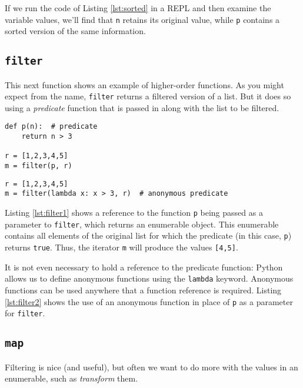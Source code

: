 \documentclass[ignorenonframetext,red]{beamer}
\begin{document}
\noindent If we run the code of Listing \ref{lst:sorted} in a REPL and then examine the variable values, we'll find that \texttt{n} retains its original value, while \texttt{p} contains a sorted version of the same information.

\subsection{\tt filter}
This next function shows an example of higher-order functions. As you might expect from the name, \texttt{filter} returns a filtered version of a list. But it does so using a \textit{predicate} function that is passed in along with the list to be filtered.

\begin{frame}[fragile]
\begin{lstlisting}[style=python,caption={Filtering a List},label={lst:filter1}]
def p(n):  # predicate
    return n > 3

r = [1,2,3,4,5]
m = filter(p, r)
\end{lstlisting}

\begin{lstlisting}[style=python,caption={Anonymous Functions},label={lst:filter2}]
r = [1,2,3,4,5]
m = filter(lambda x: x > 3, r)  # anonymous predicate
\end{lstlisting}
\end{frame}

Listing \ref{lst:filter1} shows a reference to the function \texttt{p} being passed as a parameter to \texttt{filter}, which returns an enumerable object. This enumerable contains all elements of the original list for which the predicate (in this case, \texttt{p}) returns \texttt{true}. Thus, the iterator \texttt{m} will produce the values \texttt{[4,5]}.

It is not even necessary to hold a reference to the predicate function: Python allows us to define anonymous functions using the \texttt{lambda} keyword. Anonymous functions can be used anywhere that a function reference is required. Listing \ref{lst:filter2} shows the use of an anonymous function in place of \texttt{p} as a parameter for \texttt{filter}.

\subsection{\tt map}
Filtering is nice (and useful), but often we want to do more with the values in an enumerable, such as \textit{transform} them.
\end{document}
